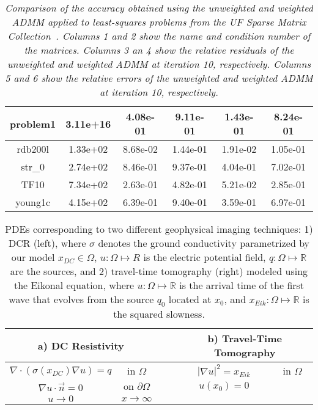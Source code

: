 \documentclass[11pt]{article}          %
\newcommand{\bbR}{\mathbb{R}}
\begin{document}
\begin{table}[!t]
\begin{tabular}{|c|c|c|c|c|c|}
problem1              & 3.11e+16             & 4.08e-01                 & 9.11e-01              & 1.43e-01             & 8.24e-01         \\ \hline
rdb200l               & 1.33e+02             & 8.68e-02                 & 1.44e-01              & 1.91e-02             & 1.05e-01         \\ \hline
str_0                 & 2.74e+02             & 8.46e-01                 & 9.37e-01              & 4.04e-01             & 7.02e-01         \\ \hline
TF10                  & 7.34e+02             & 2.63e-01                 & 4.82e-01              & 5.21e-02             & 2.85e-01         \\ \hline
young1c               & 4.15e+02             & 6.39e-01                 & 9.40e-01                  & 3.59e-01             & 6.97e-01         \\ \hline
\end{tabular}
  \caption{\textit{Comparison of the accuracy obtained using the unweighted and weighted ADMM applied to least-squares problems from the UF Sparse Matrix Collection~\cite{davis2011university}. Columns 1 and 2 show the name and condition number of the matrices. Columns 3 an 4 show the relative residuals of the unweighted and weighted ADMM at iteration 10, respectively. Columns 5 and 6 show the relative errors of the unweighted and weighted ADMM at iteration 10, respectively. 
  }}
  \label{tab:UFLeastSquares}
\end{table}
\begin{table}[!t]  
  \centering
  \begin{tabular}{ccc|ccc}
    \multicolumn{2}{c}{ \textbf{a) DC Resistivity}} & & & \multicolumn{2}{c}{ \textbf{b) Travel-Time Tomography}}
    \\
    \hline
          $\nabla \cdot (\sigma(x_{DC}) \nabla u) = q$
          & in $ \Omega$ 
          &
          &
          & $| \nabla u |^2 = x_{Eik}$
          & in $ \Omega$
    \\
          $\nabla u \cdot \vec{n} = 0$
          & $ \text{on } \partial \Omega$
          &
          &
          & $u(x_0) = 0$
          & 
    \\
          $ u \to 0$
          & $x \to \infty$
          &
          &
          &
          &
   \end{tabular}
   \caption{PDEs corresponding to two different geophysical imaging techniques: 1) DCR (left), where $\sigma$ denotes the ground conductivity parametrized by our model $x_{DC} \in \Omega$, $u: \Omega \mapsto R$ is the electric potential field, $q: \Omega \mapsto \bbR$ are the sources, and 2) travel-time tomography (right) modeled using the Eikonal equation, where $u: \Omega \mapsto \bbR$ is the arrival time of the first wave that evolves from the source $q_0$ located at $x_0$, and $x_{Eik}: \Omega \mapsto \bbR$ is the squared slowness.}
   \label{tab:PDEs}
   \vspace{-3mm}
\end{table} 
\end{document}
